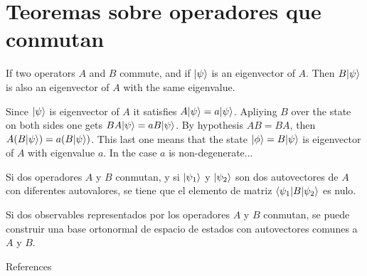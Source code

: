 \section{Teoremas sobre operadores que conmutan}

\begin{theorem}
    If two operators $A$ and $B$ commute, and if $\ket{\psi}$ is an eigenvector of $A$. Then $B \ket{\psi}$ is also an eigenvector of $A$ with the same eigenvalue.
\end{theorem}

Since $\ket{\psi}$ is eigenvector of $A$ it satisfies $A\ket{\psi} = a\ket{\psi}$. Apliying $B$ over the state on both sides one gets $BA\ket{\psi} = aB\ket{\psi}$. By hypothesis $AB = BA$, then $A(B\ket{\psi}) = a(B\ket{\psi})$. This last one means that the state $\ket{\phi} = B\ket{\psi}$ is eigenvector of $A$ with eigenvalue $a$.
In the case $a$ is non-degenerate...

\begin{theorem}
    Si dos operadores $A$ y $B$ conmutan, y si $\ket{ \psi_{1}}$ y $\ket{ \psi_{2}}$ son dos autovectores de $A$ con diferentes autovalores, se tiene que el elemento de matriz $\matrixElement{B}{\psi_{1}}{\psi_{2}}$ es nulo.
\end{theorem}


\begin{theorem}
    Si dos observables representados por los operadores $A$ y $B$ conmutan, se puede construir una base ortonormal de espacio de estados con autovectores comunes a $A$ y $B$.
\end{theorem}
References




 

